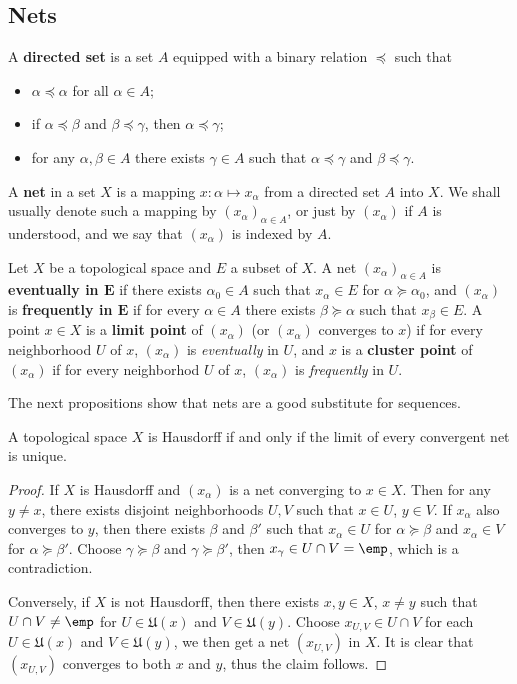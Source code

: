 \subsection{Nets}
A \textbf{directed set} is a set $A$ equipped with a binary relation $\preceq$ such that
\begin{itemize}
\item $\alpha\preceq\alpha$ for all $\alpha\in A$;
\item if $\alpha\preceq\beta$ and $\beta\preceq\gamma$, then $\alpha\preceq\gamma$;
\item for any $\alpha,\beta\in A$ there exists $\gamma\in A$ such that $\alpha\preceq\gamma$ and $\beta\preceq\gamma$.
\end{itemize}
A \textbf{net} in a set $X$ is a mapping $x:\alpha\mapsto x_\alpha$ from a directed set $A$ into $X$. We shall usually denote such a mapping by $(x_\alpha)_{\alpha\in A}$, or just by $(x_\alpha)$ if $A$ is understood, and we say that $(x_\alpha)$ is indexed by $A$.\par
Let $X$ be a topological space and $E$ a subset of $X$. A net $(x_\alpha)_{\alpha\in A}$ is \textbf{eventually in $\bm{E}$} if there exists $\alpha_0\in A$ such that $x_\alpha\in E$ for $\alpha\succeq\alpha_0$, and $(x_\alpha)$ is \textbf{frequently in $\bm{E}$} if for every $\alpha\in A$ there exists $\beta\succeq\alpha$ such that $x_\beta\in E$. A point $x\in X$ is a \textbf{limit point} of $(x_\alpha)$ (or $(x_\alpha)$ converges to $x$) if for every neighborhood $U$ of $x$, $(x_\alpha)$ is \textit{eventually} in $U$, and $x$ is a \textbf{cluster point } of $(x_\alpha)$ if for every neighborhod $U$ of $x$, $(x_\alpha)$ is \textit{frequently} in $U$.\par
The next propositions show that nets are a good substitute for sequences.
\begin{proposition}\label{Hausdorff iff nets limit unique}
A topological space $X$ is Hausdorff if and only if the limit of every convergent net is unique.
\end{proposition}
\begin{proof}
If $X$ is Hausdorff and $(x_\alpha)$ is a net converging to $x\in X$. Then for any $y\neq x$, there exists disjoint neighborhoods $U,V$ such that $x\in U$, $y\in V$. If $x_\alpha$ also converges to $y$, then there exists $\beta$ and $\beta'$ such that $x_\alpha\in U$ for $\alpha\succeq\beta$ and $x_\alpha\in V$ for $\alpha\succeq\beta'$. Choose $\gamma\succeq\beta$ and $\gamma\succeq\beta'$, then $x_\gamma\in U\cap V=\emp$, which is a contradiction.\par
Conversely, if $X$ is not Hausdorff, then there exists $x,y\in X$, $x\neq y$ such that $U\cap V\neq\emp$ for $U\in\mathfrak{U}(x)$ and $V\in\mathfrak{U}(y)$. Choose $x_{U,V}\in U\cap V$ for each $U\in\mathfrak{U}(x)$ and $V\in\mathfrak{U}(y)$, we then get a net $(x_{U,V})$ in $X$. It is clear that $(x_{U,V})$ converges to both $x$ and $y$, thus the claim follows. 
\end{proof}
